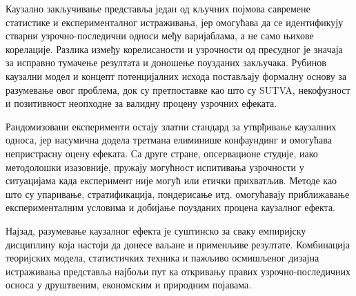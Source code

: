 \documentclass[12pt, a4paper]{article}
\begin{document}
Каузално закључивање представља један од кључних појмова савремене статистике и експерименталног истраживања, јер омогућава да се идентификују стварни узрочно-последични односи међу варијаблама, а не само њихове корелације. Разлика између корелисаности и узрочности од пресудног је значаја за исправно тумачење резултата и доношење поузданих закључака. Рубинов каузални модел и концепт потенцијалних исхода постављају формалну основу за разумевање овог проблема, док су претпоставке као што су SUTVA, некофузност и позитивност неопходне за валидну процену узрочних ефеката.

Рандомизовани експерименти остају златни стандард за утврђивање каузалних односа, јер насумична додела третмана елиминише конфаундинг и омогућава непристрасну оцену ефеката. Са друге стране, опсервационе студије, иако методолошки изазовније, пружају могућност испитивања узрочности у ситуацијама када експеримент није могућ или етички прихватљив. Методе као што су упаривање, стратификација, пондерисање итд. омогућавају приближавање експерименталним условима и добијање поузданих процена каузалног ефекта.

Најзад, разумевање каузалног ефекта је суштинско за сваку емпиријску дисциплину која настоји да донесе ваљане и применљиве резултате. Комбинација теоријских модела, статистичких техника и пажљиво осмишљеног дизајна истраживања представља најбољи пут ка откривању правих узрочно-последичних осноса у друштвеним, економским и природним појавама.



\newpage

%
\nocite{*}

\end{document}
